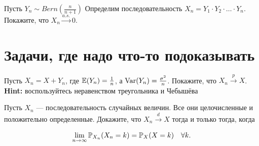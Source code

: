 \documentclass[12pt, a4paper, oneside]{article}
\begin{document}

\begin{problem}{}
Пусть $Y_n \sim Bern(\frac{n}{n+1})$ Определим последовательность $X_n = Y_1 \cdot Y_2 \cdot \ldots \cdot Y_n.$ Покажите, что $X_n \overset{a.s.}{\to} 0.$
\end{problem} 




\section{Задачи, где надо что-то подоказывать}

\begin{problem}{ } 
Пусть $X_n = X + Y_n$, где $\mathbb{E}(Y_n) = \frac{1}{n}$, а $\operatorname{Var}(Y_n) = \frac{\sigma^2}{n}$. Покажите, что $X_n \overset{p}{\to} X$. \textbf{Hint:} воспользуйтесь неравенством треугольника и Чебышёва
\end{problem} 






\begin{problem}{ } 
Пусть $X_n$ --- последовательность случайных величин. Все они целочисленные и положительно определенные. Докажите, что $X_n \overset{d}{\to} X$ тогда и только тогда, когда 

\[
\lim_{n \to \infty} \mathbb{P}_{X_n}(X_n = k) = \mathbb{P}_X(X = k) \quad  \forall k.
\]
\end{problem} 
\end{document}
